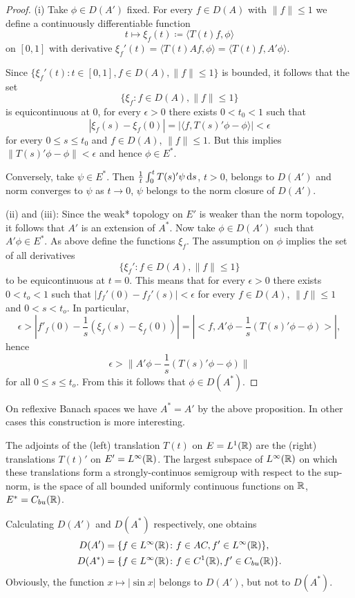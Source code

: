\begin{proof}
(i) Take $\phi \in D(A')$ fixed.
For every $f \in D(A)$ with $\|f\| \leq 1$ we define a continuously differentiable function
\[
    t \mapsto \xi_{f}(t) \coloneqq \langle T(t)f,\phi \rangle
\]
on $\left[ 0,1 \right]$ with derivative $\xi_{f}'(t) = \langle T(t)Af,\phi \rangle = \langle T(t)f,A'\phi \rangle$.

Since $\{\xi_{f}'(t) \colon t \in \left[ 0,1 \right], f \in D(A), \|f\| \leq 1\}$ is bounded, it follows that the set
\[
    \{\xi_{f} \colon f \in D(A), \|f\| \leq 1\}
\]
is equicontinuous at $0$, \ie for every $\epsilon > 0$ there exists $0 < t_{0} < 1$ such that
\[
    |\xi_{f}(s) - \xi_{f}(0)| = |\langle f,T(s)'\phi - \phi \rangle| < \epsilon
\]
for every $0 \leq s \leq t_{0}$ and $f \in D(A)$, $\|f\| \leq 1$.
But this implies $\|T(s)'\phi - \phi\| < \epsilon$ and hence $\phi \in E^{*}$.

Conversely, take $\psi \in E^{*}$.
Then $\frac{1}{t}\int_{0}^{t} T(s)'\psi \mathop{}\!\mathrm{d}{s}$, $t > 0$, belongs to $D(A')$ and norm converges to $\psi$ as $t \to 0$, \ie $\psi$ belongs to the norm closure of $D(A')$.

(ii) and (iii): Since the weak* topology on $E'$ is weaker than the norm topology, it follows that $A'$ is an extension of $A^{*}$.
Now take $\phi \in D(A')$ such that $A'\phi \in E^{*}$.
As above define the functions $\xi_{f}$. 
The assumption on $\phi$ implies the set of all derivatives
\[
\{\xi_{f}' \colon f \in D(A), \|f\| \leq 1\}
\]
to be equicontinuous at $t = 0$. 
This means that for every $\epsilon > 0$ there exists $0 < t_o < 1$ such that $|f_f'(0) - f_f'(s)| < \epsilon$ for every $f \in D(A)$, $\|f\| \leq 1$ and $0 < s < t_o$.
In particular,
\[
    \epsilon > |f'_f(0) - \frac{1}{s}(\xi_f(s)-\xi_f(0))| = |<f,A'\phi - \frac{1}{s}(T(s)'\phi-\phi)>| ,
\]
hence
\[
    \epsilon > \|A'\phi - \frac{1}{s}(T(s)'\phi-\phi)\|
\]
for all $0 \leq s \leq t_o$.
From this it follows that $\phi \in D(A^*)$.
\end{proof}
On reflexive Banach spaces we have $A^* = A'$ by the above proposition.
In other cases this construction is more interesting.
\begin{example*}[continued]\label{ex:a1-3.4}
The adjoints of the (left) translation $T(t)$ on $E = L^1(\mathbb{R})$ are the (right) translations $T(t)'$ on $E' = L^\infty(\mathbb{R})$.
The largest subspace of $L^\infty(\mathbb{R})$ on which these translations form a strongly-continuos semigroup with respect to the sup-norm, is the space of all bounded uniformly continuous functions on $\mathbb{R}$, \ie $E^* = C_{bu}(\mathbb{R})$.

Calculating $D(A')$ and $D(A^*)$ respectively, one obtains
\begin{align*}
    D(A') &= \{f \in L^\infty(\mathbb{R}) \colon f \in AC, f' \in L^\infty(\mathbb{R})\}, \\
    D(A^*) &= \{f \in L^\infty(\mathbb{R}) \colon f \in C^1(\mathbb{R}), f' \in C_{bu}(\mathbb{R})\}.
\end{align*}
Obviously, the function $x \mapsto |\sin x|$ belongs to $D(A')$, but not to $D(A^*)$.
\end{example*}
